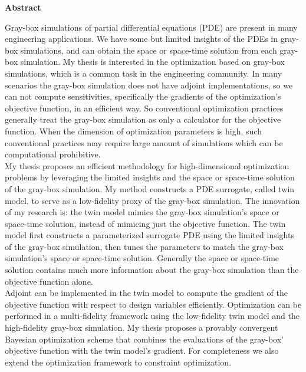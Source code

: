 \documentclass[a4paper,onecolumn]{article}
\theoremstyle{remark}
\begin{document}
\setcounter{page}{1}

$$ $$
\newpage
\hspace{.4\textwidth}
\Large\textbf{Abstract}\\
\normalsize

\noindent Gray-box simulations of partial differential equations (PDE) are
present in many engineering applications. 
We have some but limited
insights of the PDEs in gray-box simulations, and can obtain the space or space-time 
solution from each gray-box simulation.
My thesis is interested in the optimization based on gray-box simulations,
which is a common task in the engineering community.
In many scenarios the gray-box simulation does not have adjoint implementations,
so we can not compute sensitivities, specifically the gradients of 
the optimization's objective function, in an efficient way. 
So conventional optimization practices generally treat the gray-box simulation
as only a calculator for the objective function. 
When the dimension of optimization parameters is high,
such conventional practices may require large amount of simulations which can be 
computational prohibitive.\\

\noindent My thesis proposes an efficient methodology for
high-dimensional optimization problems by leveraging the limited insights
and the space or space-time solution of the gray-box simulation. 
My method constructs a PDE surrogate, 
called twin model, to serve as a low-fidelity proxy of the gray-box simulation. 
The innovation of my research is: the twin model mimics the gray-box simulation's space 
or space-time solution, instead of mimicing just the objective function.
The twin model first constructs a parameterized surrogate PDE using the limited insights of the 
gray-box simulation, then tunes the parameters to match the 
gray-box simulation's space or space-time solution.
Generally the space or space-time solution contains much more information 
about the gray-box simulation than the objective function alone.\\

\noindent Adjoint can be implemented in the twin model to 
compute the gradient of the objective function with respect to design variables efficiently.
Optimization can be performed in a multi-fidelity framework using the low-fidelity
twin model and the high-fidelity gray-box simulation.
My thesis proposes a provably convergent Bayesian optimization scheme that combines
the evaluations of the gray-box' objective function with the twin model's gradient.
For completeness we also extend the optimization framework to constraint optimization.
\\
\end{document}
